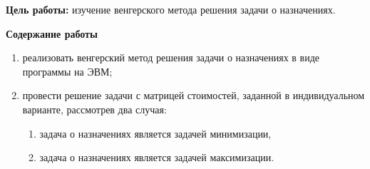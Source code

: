 




\textbf{Цель работы:} изучение венгерского метода решения задачи о назначениях.

\textbf{Содержание работы}
\begin{enumerate}
	\item реализовать венгерский метод решения задачи о назначениях в виде программы на ЭВМ\footnotemark;
	\item провести решение задачи с матрицей стоимостей, заданной в индивидуальном варианте, рассмотрев два случая:
	\begin{enumerate}
		\item задача о назначениях является задачей минимизации,
		\item задача о назначениях является задачей максимизации.
	\end{enumerate}
\end{enumerate}

